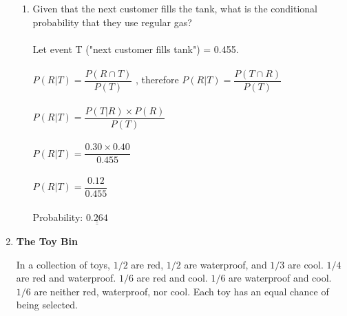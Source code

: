 \documentclass[12pt,a4paper]{article}
\numberwithin{equation}{subsection}
\def\doubleunderline#1{\underline{\underline{#1}}}
\begin{document}
\begin{enumerate}
\begin{enumerate}
\item Given that the next customer fills the tank, what is the conditional probability that they use regular gas? \\ \\
Let event T ("next customer fills tank") = 0.455. \\ \\
$P(R|T) = \dfrac{P(R \cap T)}{P(T)}$ , therefore $P(R|T) = \dfrac{P(T \cap R)}{P(T)}$ \\ \\
$P(R|T) = \dfrac{P(T|R) \times P(R)}{P(T)}$ \\ \\
$P(R|T) = \dfrac{0.30 \times 0.40}{0.455}$ \\ \\
$P(R|T) = \dfrac{0.12}{0.455}$ \\ \\
Probability: $\doubleunderline{0.264}$ \\

\end{enumerate}


\item \textbf{The Toy Bin}

 In a collection of toys, $1/2$ are red, $1/2$ are waterproof, and $1/3$ are cool. $1/4$ are red and waterproof.  $1/6$ are red and cool. $1/6$ are waterproof and cool. $1/6$ are neither red, waterproof, nor cool. Each toy has an equal chance of being selected.
 

\end{enumerate}
\end{document}
